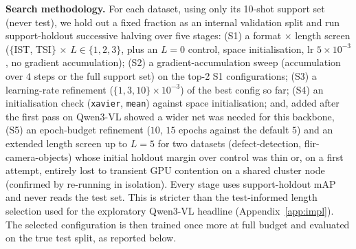 \documentclass{article}
\newcommand{\qwen}{Qwen3-VL}
\begin{document}
\textbf{Search methodology.}
For each dataset, using only its 10-shot support set (never test), we hold out a fixed fraction as an internal validation split and run support-holdout successive halving over five stages: (S1) a format $\times$ length screen ($\{$IST, TSI$\}$ $\times$ $L \in \{1,2,3\}$, plus an $L{=}0$ control, space initialisation, lr $5{\times}10^{-3}$, no gradient accumulation); (S2) a gradient-accumulation sweep (accumulation over $4$ steps or the full support set) on the top-2 S1 configurations; (S3) a learning-rate refinement ($\{1{,}3{,}10\}{\times}10^{-3}$) of the best config so far; (S4) an initialisation check (\texttt{xavier}, \texttt{mean}) against space initialisation; and, added after the first pass on \qwen{} showed a wider net was needed for this backbone, (S5) an epoch-budget refinement ($10$, $15$ epochs against the default $5$) and an extended length screen up to $L{=}5$ for two datasets (defect-detection, flir-camera-objects) whose initial holdout margin over control was thin or, on a first attempt, entirely lost to transient GPU contention on a shared cluster node (confirmed by re-running in isolation).
Every stage uses support-holdout mAP and never reads the test set. This is
stricter than the test-informed length selection used for the exploratory
\qwen{} headline (Appendix~\ref{app:impl}).
The selected configuration is then trained once more at full budget and evaluated on the true test split, as reported below.
\end{document}
